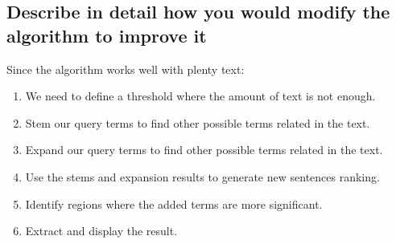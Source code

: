 \documentclass{article}
\newcounter{sub}[section]
\begin{document}
\subsection*{Describe in detail how you would modify the algorithm to improve it}
Since the algorithm works well with plenty text:
\begin{enumerate}
	\item We need to define a threshold where the amount of text is not enough.
	\item Stem our query terms to find other possible terms related in the text.
	\item Expand our query terms to find other possible terms related in the text.
	\item Use the stems and expansion results to generate new sentences ranking.
	\item Identify regions where the added terms are more significant.
	\item Extract and display the result.
\end{enumerate}
\end{document}
